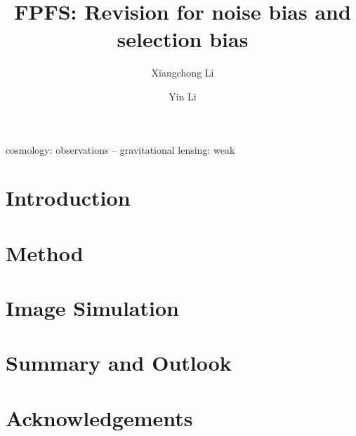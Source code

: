 \documentclass{aa}
\begin{document}
\title{FPFS: Revision for noise bias and selection bias}
\author{Xiangchong Li
\and Yin Li}

\abstract
{}
{

}
{
}
{
}
{
}

\begin{keywords}
cosmology: observations -- gravitational lensing: weak
\end{keywords}
\maketitle

\section{Introduction}
\label{sec:Intro}


\section{Method}
\label{sec:Method}


\section{Image Simulation}
\label{sec:sim}



\section{Summary and Outlook}
\label{sec:Summary}

\section*{Acknowledgements}




\appendix
\end{document}
